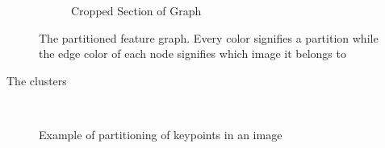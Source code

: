 \documentclass{article}
\begin{document}
\begin{figure}
{\begin{subfigure}[t]{0.60\textwidth}
			\caption{Cropped Section of Graph}
			\label{fig:cropped_graph}
		\end{subfigure}%
	}%
	\label{fig:graph}
	\caption{The partitioned feature graph. Every color signifies a 
partition while the edge color of each node signifies which image it 
belongs to}
\end{figure}

The clusters 
\begin{figure}
	\\
	\label{fig:compare_mirror}
	\caption{Example of partitioning of keypoints in an image}
\end{figure}
\end{document}

